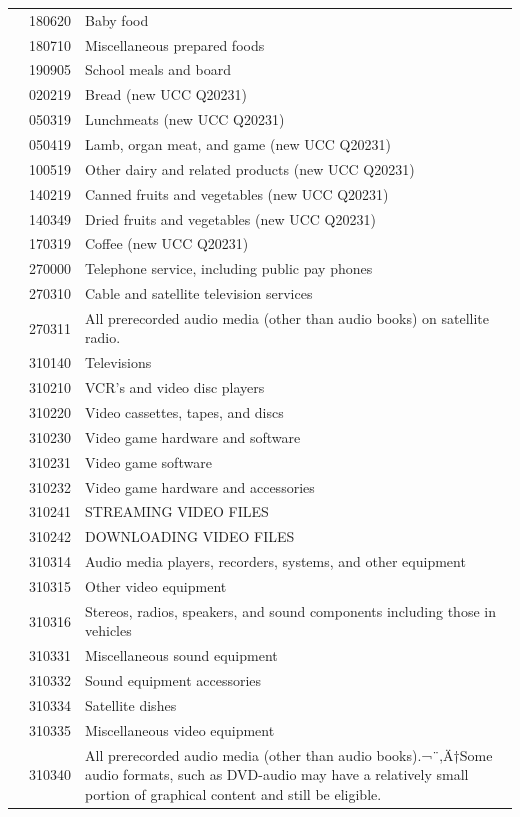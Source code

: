 \documentclass[
]{agujournal2019}
\begin{document}
\begin{table}
{\begin{tabular*}{\linewidth}{@{\extracolsep{\fill}}l|rl}
 & 180620 & Baby food \\ 
 & 180710 & Miscellaneous prepared foods \\ 
 & 190905 & School meals and board \\ 
 & 020219 & Bread (new UCC Q20231) \\ 
 & 050319 & Lunchmeats (new UCC Q20231) \\ 
 & 050419 & Lamb, organ meat, and game (new UCC Q20231) \\ 
 & 100519 & Other dairy and related products (new UCC Q20231) \\ 
 & 140219 & Canned fruits and vegetables (new UCC Q20231) \\ 
 & 140349 & Dried fruits and vegetables (new UCC Q20231) \\ 
 & 170319 & Coffee (new UCC Q20231) \\ 
\midrule\addlinespace[2.5pt]
\multirow[t]{69}{*}{Leisure} & 270000 & Telephone service, including public pay phones \\ 
 & 270310 & Cable and satellite television services \\ 
 & 270311 & All prerecorded audio media (other than audio books) on satellite radio. \\ 
 & 310140 & Televisions \\ 
 & 310210 & VCR's and video disc players \\ 
 & 310220 & Video cassettes, tapes, and discs \\ 
 & 310230 & Video game hardware and software \\ 
 & 310231 & Video game software \\ 
 & 310232 & Video game hardware and accessories \\ 
 & 310241 & STREAMING VIDEO FILES \\ 
 & 310242 & DOWNLOADING VIDEO FILES \\ 
 & 310314 & Audio media players, recorders, systems, and other equipment \\ 
 & 310315 & Other video equipment \\ 
 & 310316 & Stereos, radios, speakers, and sound components including those in vehicles \\ 
 & 310331 & Miscellaneous sound equipment \\ 
 & 310332 & Sound equipment accessories \\ 
 & 310334 & Satellite dishes \\ 
 & 310335 & Miscellaneous video equipment \\ 
 & 310340 & All prerecorded audio media (other than audio books).¬¨‚Ä†Some audio formats, such as DVD-audio may have a relatively small portion of graphical content and still be eligible. \\ 

\end{tabular*}}
\end{table}
\end{document}
